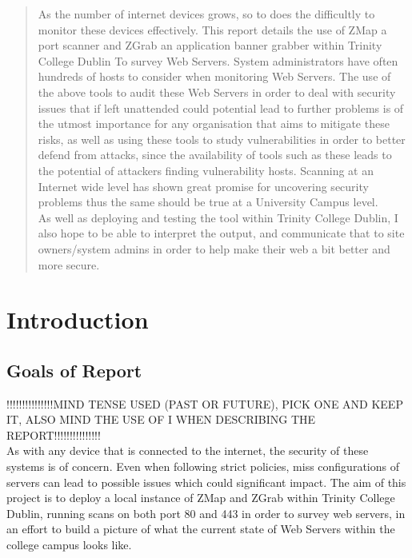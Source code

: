 \documentclass[a4wide,leqno,12pt]{report}
\begin{document}
\begin{abstract}
\noindent
As the number of internet devices grows, so to does the difficultly to monitor these devices effectively. This report details the use of ZMap a port scanner and ZGrab an application banner grabber within Trinity College Dublin To survey Web Servers. System administrators have often hundreds of hosts to consider when monitoring Web Servers. The use of the above tools to audit these Web Servers in order to deal with security issues that if left unattended could potential lead to further problems is of the utmost importance for any organisation that aims to mitigate these risks, as well as using these tools to study vulnerabilities in order to better defend from attacks, since the availability of tools such as these leads to the potential of attackers finding vulnerability hosts. Scanning at an Internet wide level has shown great promise for uncovering security problems \cite{durumeric2015search} thus the same should be true at a University Campus level.\\

As well as deploying and testing the tool within Trinity College Dublin, I also hope to be able to interpret the output, and communicate that to site owners/system admins in order to help make their web a bit better and more secure.

\end{abstract}


\chapter{Introduction}
\section{Goals of Report} 
!!!!!!!!!!!!!!!MIND TENSE USED (PAST OR FUTURE), PICK ONE AND KEEP IT, ALSO MIND THE USE OF I WHEN DESCRIBING THE REPORT!!!!!!!!!!!!!!!\\



As with any device that is connected to the internet, the  security of these systems is of concern. Even when following strict policies,  miss configurations of servers can lead to possible issues which could significant impact. The aim of this project is to deploy a local instance of ZMap and ZGrab within Trinity College Dublin, running scans on both port 80 and 443 in order to survey web servers, in an effort to build a picture of what the current state of Web Servers within the college campus looks like.\\
\end{document}

